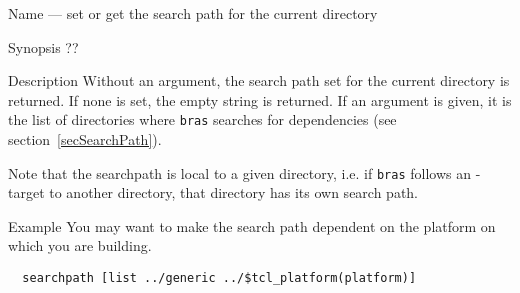 \documentclass[12pt]{article}
\newcommand{\bras}{\texttt{bras}}
\begin{document}
\begin{Describe}
\item[Name]  --- set or get the search path for the
  current directory
\item[Synopsis]  ??
\item[Description] Without an argument, the search path set for the
  current directory is returned. If none is set, the empty string is
  returned. If an argument is given, it is the list of directories
  where \bras{} searches for dependencies (see
  section~\ref{secSearchPath}). 

  Note that the searchpath is local to a given directory, i.e. if
  \bras{} follows an -target to another directory, that
  directory has its own search path.
\item[Example]
You may want to make the search path dependent on the platform on
which you are building.
\begin{verbatim}
  searchpath [list ../generic ../$tcl_platform(platform)]
\end{verbatim}
\end{Describe}

\end{document}
